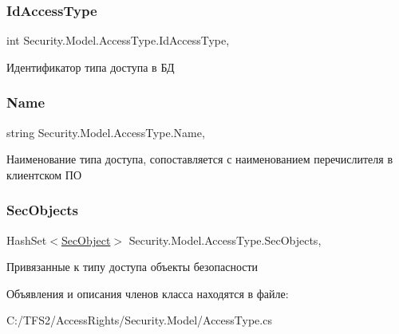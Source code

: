 \subsubsection{\texorpdfstring{Id\+Access\+Type}{IdAccessType}}
{\footnotesize\ttfamily int Security.\+Model.\+Access\+Type.\+Id\+Access\+Type\hspace{0.3cm}{\ttfamily [get]}, {\ttfamily [set]}}



Идентификатор типа доступа в БД 

\mbox{\label{class_security_1_1_model_1_1_access_type_aedfe5970aec5df6c5752f917f7d80641}} 
\subsubsection{\texorpdfstring{Name}{Name}}
{\footnotesize\ttfamily string Security.\+Model.\+Access\+Type.\+Name\hspace{0.3cm}{\ttfamily [get]}, {\ttfamily [set]}}



Наименование типа доступа, сопоставляется с наименованием перечислителя в клиентском ПО 

\mbox{\label{class_security_1_1_model_1_1_access_type_aad9c922e320edaf15f2f4d74a0b2ecfa}} 
\subsubsection{\texorpdfstring{Sec\+Objects}{SecObjects}}
{\footnotesize\ttfamily Hash\+Set$<$\hyperlink{class_security_1_1_model_1_1_sec_object}{Sec\+Object}$>$ Security.\+Model.\+Access\+Type.\+Sec\+Objects\hspace{0.3cm}{\ttfamily [get]}, {\ttfamily [set]}}



Привязанные к типу доступа объекты безопасности 



Объявления и описания членов класса находятся в файле\+:\begin{DoxyCompactItemize}
\item 
C\+:/\+T\+F\+S2/\+Access\+Rights/\+Security.\+Model/Access\+Type.\+cs\end{DoxyCompactItemize}
